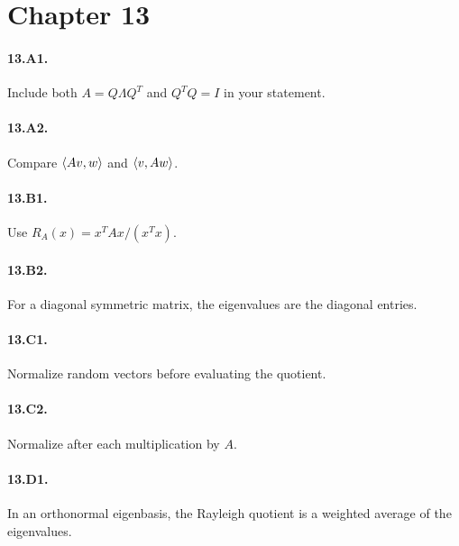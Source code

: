 \section*{Chapter 13}
\paragraph{13.A1.} Include both $A=Q\Lambda Q^T$ and $Q^TQ=I$ in your
statement.
\paragraph{13.A2.} Compare $\left\langle Av,w \right\rangle$ and $\left\langle v,Aw \right\rangle$.
\paragraph{13.B1.} Use $R_A(x)=x^TAx/(x^Tx)$.
\paragraph{13.B2.} For a diagonal symmetric matrix, the eigenvalues are the
diagonal entries.
\paragraph{13.C1.} Normalize random vectors before evaluating the quotient.
\paragraph{13.C2.} Normalize after each multiplication by $A$.
\paragraph{13.D1.} In an orthonormal eigenbasis, the Rayleigh quotient is a
weighted average of the eigenvalues.
